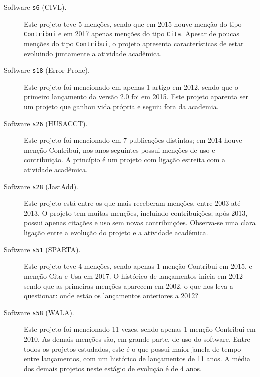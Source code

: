 \begin{description}

  \item[Software \texttt{s6} (CIVL).]
    Este projeto teve 5 menções, sendo que em 2015 houve menção do tipo \texttt{Contribui} 
    e em 2017 apenas menções do tipo \texttt{Cita}. 
    Apesar de poucas menções do tipo \texttt{Contribui},
    o projeto apresenta características de estar evoluindo juntamente a atividade
    acadêmica.

  \item[Software \texttt{s18} (Error Prone).]
    Este projeto foi mencionado em apenas 1 artigo em 2012, sendo que o
    primeiro lançamento da versão 2.0 foi em 2015. Este projeto aparenta ser um
    projeto que ganhou vida própria e seguiu fora da academia.

  \item[Software \texttt{s26} (HUSACCT).]
    Este projeto foi mencionado em 7 publicações distintas; em 2014 houve
    menção Contribui, nos anos seguintes possui menções de uso e contribuição.
    A princípio é um projeto com ligação estreita com a atividade acadêmica.

  \item[Software \texttt{s28} (JastAdd).]
    Este projeto está entre os que mais receberam menções, entre 2003 até 2013.
    O projeto tem muitas menções, incluindo contribuições; após 2013, possui apenas
    citações e uso sem novas contribuições. Observa-se uma clara ligação
    entre a evolução do projeto e a atividade acadêmica.

  \item[Software \texttt{s51} (SPARTA).]
    Este projeto teve 4 menções, sendo apenas 1 menção Contribui em 2015,
    e menção Cita e Usa em 2017. O histórico de lançamentos inicia em 2012
    sendo que as primeiras menções aparecem em 2002, o que nos leva a
    questionar: onde estão os lançamentos anteriores a 2012?

  \item[Software \texttt{s58} (WALA).]
    Este projeto foi mencionado 11 vezes, sendo apenas 1 menção Contribui em 2010.
    As demais menções são, em grande parte, de uso do software. 
    Entre todos os projetos estudados, este é o que possui maior janela de tempo entre lançamentos, 
    com um histórico de lançamentos de 11 anos. A média dos demais  projetos neste estágio de evolução
    é de 4 anos.

\end{description}

